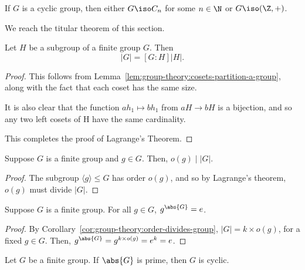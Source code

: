 \documentclass[12pt]{report}
\begin{document}
\begin{lemma}
  If \(G\) is a cyclic group, then either \(G \iso C_{n}\) for some \(n \in \N\) or \(G \iso (\Z, +)\).
\end{lemma}

We reach the titular theorem of this section.

\begin{theorem}\label{thm:group-theory:lagranges-theorem}
  Let \(H\) be a subgroup of a finite group \(G\). Then
  \[|G| = [G : H]|H|.\]
\end{theorem}

\begin{proof}
  This follows from Lemma~\ref{lem:group-theory:cosets-partition-a-group}, along with the fact that each coset has the same size.

  It is also clear that the function \(ah_{1} \mapsto bh_{1}\)  from \(aH \to bH\) is a bijection, and so any two left cosets of H have the same cardinality.

  This completes the proof of Lagrange's Theorem.
\end{proof}



\begin{corollary}
\label{cor:group-theory:order-divides-group}
  Suppose \(G\) is a finite group and \(g \in G\).
  Then, \(o(g) \mid \left|G\right|\).
\end{corollary}

\begin{proof}
  The subgroup \(\langle g \rangle \leq G\) has order \(o(g)\), and so by Lagrange's theorem, \(o(g)\) must divide \(|G|\).
\end{proof}

\begin{corollary}
\label{cor:group-theory:g-to-power-of-group-order-is-e}
  Suppose \(G\) is a finite group.
  For all \(g \in G\), \(g^{\abs{G}} = e\).
\end{corollary}

\begin{proof}
  By Corollary~\ref{cor:group-theory:order-divides-group}, \(|G| = k \times o(g)\), for a fixed \(g \in G\).
  Then, \(g^{\abs{G}} = g^{k \times o(g)} = e^{k} = e\).
\end{proof}

\begin{corollary}
  Let \(G\) be a finite group.
  If \(\abs{G}\) is prime, then \(G\) is cyclic.
\end{corollary}
\end{document}
